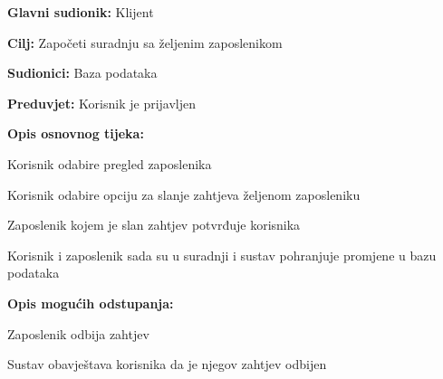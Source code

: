 				
					\noindent {}
					\begin{packed_item}
						
						\item \textbf{Glavni sudionik:} Klijent
						\item  \textbf{Cilj:} Započeti suradnju sa željenim zaposlenikom
						\item  \textbf{Sudionici:} Baza podataka
						\item  \textbf{Preduvjet:} Korisnik je prijavljen
						\item  \textbf{Opis osnovnog tijeka:}
						
						\item[] \begin{packed_enum}
							
							\item Korisnik odabire pregled zaposlenika
							\item Korisnik odabire opciju za slanje zahtjeva željenom zaposleniku
							\item Zaposlenik kojem je slan zahtjev potvrđuje korisnika
							\item Korisnik i zaposlenik sada su u suradnji i sustav pohranjuje promjene u bazu podataka
							
						\end{packed_enum}
					
						\item	\textbf{Opis mogućih odstupanja:}
						
						\item[] \begin{packed_enum}
							
							\item[3.a] Zaposlenik odbija zahtjev
							\item[] \begin{packed_enum}
								
								\item Sustav obavještava korisnika da je njegov zahtjev odbijen
								
							\end{packed_enum}
						
						\end{packed_enum}
						
					\end{packed_item}
				
